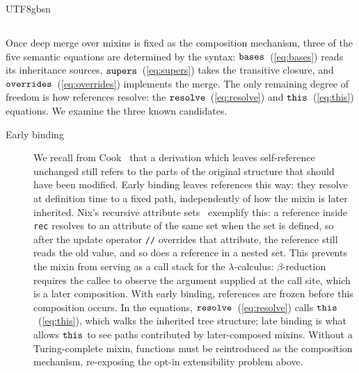 \begin{CJK*}{UTF8}{gbsn}
\subsection*{}

Once deep merge over mixins is fixed as the composition
mechanism, three of the five semantic equations are determined
by the syntax:
$\mathtt{bases}$~(\ref{eq:bases}) reads its inheritance
sources, $\mathtt{supers}$~(\ref{eq:supers}) takes the transitive
closure, and $\mathtt{overrides}$~(\ref{eq:overrides}) implements
the merge.
The only remaining degree of freedom is how references
resolve: the $\mathtt{resolve}$~(\ref{eq:resolve}) and
$\mathtt{this}$~(\ref{eq:this}) equations.
We examine the three known candidates.

\begin{description}
  \item[Early binding]
    We recall from Cook~\cite{cook1989-denotational-inheritance} that a
    derivation which leaves self-reference unchanged still refers to the
    parts of the original structure that should have been modified.
    Early binding leaves references this way: they resolve at
    definition time to a fixed path, independently of how the mixin is
    later inherited.
    Nix's recursive attribute sets~\cite{dolstra2010-nixos} exemplify
    this: a reference inside \texttt{rec} resolves to an
    attribute of the same set when the set is defined, so after the
    update operator \texttt{//} overrides that attribute, the
    reference still reads the old value, and so does a reference in a
    nested set.
    This prevents the mixin from serving as a call stack for the
    $\lambda$-calculus: $\beta$-reduction requires the callee to
    observe the argument supplied at the call site, which is a
    later composition.
    With early binding, references are frozen before this
    composition occurs.
    In the equations,
    $\mathtt{resolve}$~(\ref{eq:resolve}) calls
    $\mathtt{this}$~(\ref{eq:this}), which walks the inherited
    tree structure; late binding is what allows
    $\mathtt{this}$ to see paths contributed by later-composed
    mixins.
    Without a Turing-complete mixin, functions must be
    reintroduced as the composition mechanism, re-exposing
    the opt-in extensibility problem above.


\end{description}
\end{CJK*}
